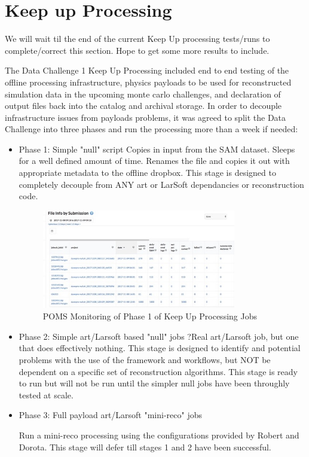 \documentclass[pdftex,12pt,letter]{article}
\begin{document}
\section {Keep up Processing}

 \color{red} We will wait til the end of the current Keep Up processing tests/runs to complete/correct this section. Hope to get some more results to include.
 \color{black}

The Data Challenge 1 Keep Up Processing  included end to end testing of the offline processing infrastructure, physics payloads to be used for reconstructed simulation data in the upcoming monte carlo challenges, and declaration of output files back into the catalog and archival storage.  In order to decouple infrastructure issues from  payloads problems, it was agreed to split the Data Challenge into three phases and run the processing more than a week if needed:
\begin {itemize}

\item Phase 1: Simple "null" script
 Copies in input from the SAM dataset.  Sleeps for a well defined amount of time.  Renames the file and copies it out with appropriate metadata to the offline dropbox.
This stage is designed to completely decouple from ANY art or LarSoft dependancies or reconstruction code. 



\begin{figure}[tbh]
  \centering
  \includegraphics[width=0.8\textwidth]{./ReportImages/Phase1keepup.jpg}
  \caption{POMS Monitoring of Phase 1 of Keep Up Processing Jobs}
  \label{fig:keepupprocessingphase1}
\end{figure}


\item Phase 2: Simple art/Larsoft based "null" jobs
 ?Real art/Larsoft job, but one that does effectively nothing.  This stage is designed to identify and potential problems with the use of the framework and workflows, but NOT be dependent on a specific set of reconstruction algorithms.  
 This stage is ready to run but will not be run until the simpler null jobs have been throughly tested at scale.


\item Phase 3: Full payload art/Larsoft "mini-reco" jobs

 Run  a mini-reco processing using the configurations provided by Robert and Dorota. This stage will defer till stages 1 and 2 have been successful.

\end{itemize}
\end{document}
